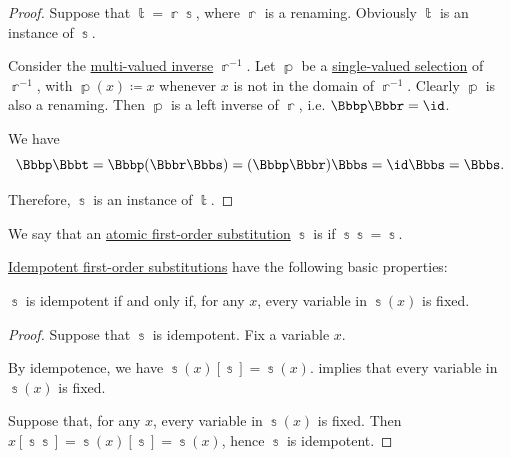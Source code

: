 \begin{proof}
  \NecessitySubProof* Suppose that \( \Bbbt = \Bbbr\Bbbs \), where \( \Bbbr \) is a renaming. Obviously \( \Bbbt \) is an instance of \( \Bbbs \).

  Consider the \hyperref[def:set_valued_function/inverse]{multi-valued inverse} \( \Bbbr^{-1} \). Let \( \Bbbp \) be a \hyperref[def:set_valued_selection]{single-valued selection} of \( \Bbbr^{-1} \), with \( \Bbbp(x) \coloneqq x \) whenever \( x \) is not in the domain of \( \Bbbr^{-1} \). Clearly \( \Bbbp \) is also a renaming. Then \( \Bbbp \) is a left inverse of \( \Bbbr \), i.e. \( \Bbbp\Bbbr = \id \).

  We have
  \begin{equation*}
    \Bbbp\Bbbt
    =
    \Bbbp(\Bbbr\Bbbs)
    =
    (\Bbbp\Bbbr)\Bbbs
    =
    \id\Bbbs
    =
    \Bbbs.
  \end{equation*}

  Therefore, \( \Bbbs \) is an instance of \( \Bbbt \).
\end{proof}

\begin{definition}\label{def:fol_idempotent_substitution}
  We say that an \hyperref[def:atomic_fol_substitution]{atomic first-order substitution} \( \Bbbs \) is  if \( \Bbbs\Bbbs = \Bbbs \).
\end{definition}

\begin{proposition}\label{thm:def:fol_idempotent_substitution}
  \hyperref[def:fol_idempotent_substitution]{Idempotent first-order substitutions} have the following basic properties:
  \begin{thmenum}
     \( \Bbbs \) is idempotent if and only if, for any \( x \), every variable in \( \Bbbs(x) \) is fixed.
  \end{thmenum}
\end{proposition}
\begin{proof}
  \SufficiencySubProof* Suppose that \( \Bbbs \) is idempotent. Fix a variable \( x \).

  By idempotence, we have \( \Bbbs(x)[\Bbbs] = \Bbbs(x) \).  implies that every variable in \( \Bbbs(x) \) is fixed.

  \NecessitySubProof* Suppose that, for any \( x \), every variable in \( \Bbbs(x) \) is fixed. Then \( x[\Bbbs\Bbbs] = \Bbbs(x)[\Bbbs] = \Bbbs(x) \), hence \( \Bbbs \) is idempotent.
\end{proof}


